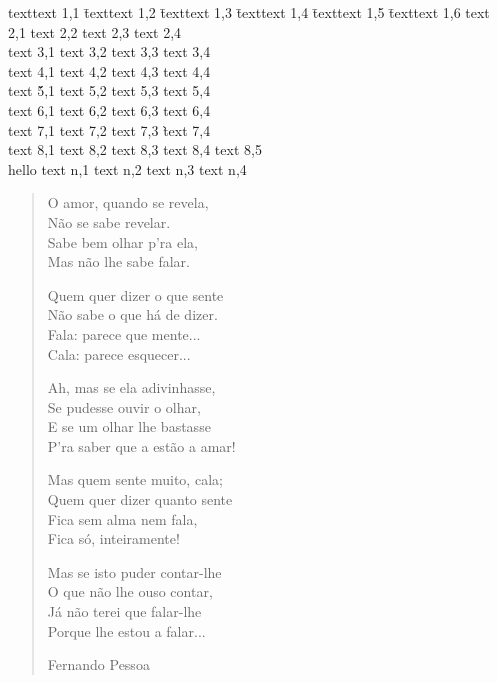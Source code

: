 \documentclass[environments-demo.tex]{subfiles}
\begin{document}
\begin{tabbing}
texttext 1,1 \= texttext 1,2 \= texttext 1,3 \= texttext 1,4 \= texttext 1,5 \= texttext 1,6 \kill
text 2,1 \> text 2,2 \> text 2,3 \> text 2,4 \+\\
text 3,1 \> text 3,2 \> text 3,3 \> text 3,4 \-\\
text 4,1 \> text 4,2 \> text 4,3 \> text 4,4 \+\+\\
text \' 5,1 \> text 5,2 \> text 5,3 \> text 5,4 \-\\
text 6,1 \> text 6,2 \> text 6,3 \> text 6,4 \-\\
text 7,1 \> text 7,2 \> text 7,3 \` text 7,4 \\
text 8,1 \> text 8,2 \> text 8,3 \> text 8,4 \> text 8,5 \+\+\\
\< hello \> text n,1 \> text n,2 \> text n,3 \> text n,4 %
\end{tabbing}

\begin{verse}
O amor, quando se revela,\\
Não se sabe revelar.\\
Sabe bem olhar p'ra ela,\\
Mas não lhe sabe falar.

Quem quer dizer o que sente\\
Não sabe o que há de dizer.\\
Fala: parece que mente...\\
Cala: parece esquecer...

Ah, mas se ela adivinhasse,\\
Se pudesse ouvir o olhar,\\
E se um olhar lhe bastasse\\
P'ra saber que a estão a amar!

Mas quem sente muito, cala;\\
Quem quer dizer quanto sente\\
Fica sem alma nem fala,\\
Fica só, inteiramente!

Mas se isto puder contar-lhe\\
O que não lhe ouso contar,\\
Já não terei que falar-lhe\\
Porque lhe estou a falar...

Fernando Pessoa
\end{verse}
\end{document}
